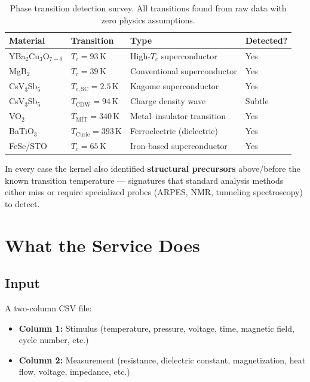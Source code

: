 \documentclass[11pt,letterpaper]{article}
\begin{document}
\begin{table}[h]
\centering
\begin{tabular}{@{}llll@{}}
\toprule
\textbf{Material} & \textbf{Transition} & \textbf{Type} & \textbf{Detected?} \\
\midrule
YBa$_2$Cu$_3$O$_{7-\delta}$ & $T_c = 93$\,K & High-$T_c$ superconductor & Yes \\
MgB$_2$ & $T_c = 39$\,K & Conventional superconductor & Yes \\
CsV$_3$Sb$_5$ & $T_{c,\text{SC}} = 2.5$\,K & Kagome superconductor & Yes \\
CsV$_3$Sb$_5$ & $T_{\text{CDW}} = 94$\,K & Charge density wave & Subtle \\
VO$_2$ & $T_{\text{MIT}} = 340$\,K & Metal--insulator transition & Yes \\
BaTiO$_3$ & $T_{\text{Curie}} = 393$\,K & Ferroelectric (dielectric) & Yes \\
FeSe/STO & $T_c = 65$\,K & Iron-based superconductor & Yes \\
\bottomrule
\end{tabular}
\caption{Phase transition detection survey. All transitions found from
raw data with zero physics assumptions.}
\end{table}

In every case the kernel also identified \textbf{structural precursors}
above/before the known transition temperature --- signatures that
standard analysis methods either miss or require specialized probes
(ARPES, NMR, tunneling spectroscopy) to detect.

\section{What the Service Does}

\subsection{Input}

A two-column CSV file:
\begin{itemize}
  \item \textbf{Column 1:} Stimulus (temperature, pressure, voltage,
    time, magnetic field, cycle number, etc.)
  \item \textbf{Column 2:} Measurement (resistance, dielectric constant,
    magnetization, heat flow, voltage, impedance, etc.)
\end{itemize}
\end{document}
